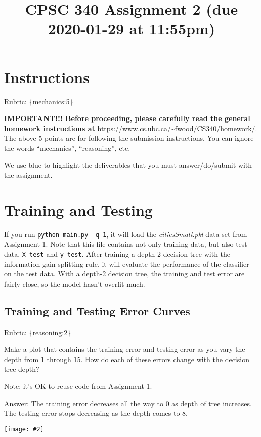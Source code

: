 \documentclass{article}
\def\rubric#1{\gre{Rubric: \{#1\}}}{}
\def\ans#1{\par\gre{Answer: #1}}
\def\blu#1{{\color{blu}#1}}
\def\gre#1{{\color{gre}#1}}
\newcommand{\fig}[2]{\texttt{[image: \#2]}}
\begin{document}
\title{CPSC 340 Assignment 2 (due 2020-01-29 at 11:55pm)}
\author{}
\date{}
\maketitle
\vspace{-4em}

\section*{Instructions}
\rubric{mechanics:5}

\textbf{IMPORTANT!!! Before proceeding, please carefully read the general homework instructions at} \url{https://www.cs.ubc.ca/~fwood/CS340/homework/}. The above 5 points are for following the submission instructions. You can ignore the words ``mechanics'', ``reasoning'', etc.

\vspace{1em}
We use \blu{blue} to highlight the deliverables that you must answer/do/submit with the assignment.

\section{Training and Testing}
If you run \texttt{python main.py \string-q 1}, it will load the \emph{citiesSmall.pkl} data set from Assignment 1.
Note that this file contains not only training data, but also test data, \texttt{X\string_test} and \texttt{y\string_test}.
After training a depth-2 decision tree with the information gain splitting rule, it will evaluate the performance of the classifier on the test data.
With a depth-2 decision tree, the training and test error are fairly close, so the model hasn't overfit much.

\subsection{Training and Testing Error Curves}
\rubric{reasoning:2}

\blu{Make a plot that contains the training error and testing error as you vary the depth from 1 through 15. How do each of these errors change with the decision tree depth?}

Note: it's OK to reuse code from Assignment 1.
\ans{The training error decreases all the way to 0 as depth of tree increases. The testing error stops decreasing as the depth comes to 8.}
\par
\fig{1}{../figs/q1_1_tree_errors}
\end{document}
